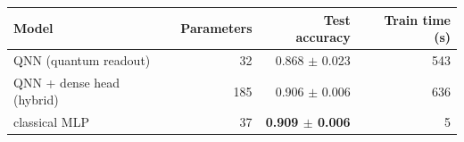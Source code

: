 \begin{tabular}{lrrr}
\toprule
Model & Parameters & Test accuracy & Train time (s) \\
\midrule
QNN (quantum readout) & 32 & 0.868 $\pm$ 0.023 & 543 \\
QNN + dense head (hybrid) & 185 & 0.906 $\pm$ 0.006 & 636 \\
classical MLP & 37 & \textbf{0.909 $\pm$ 0.006} & 5 \\
\bottomrule
\end{tabular}
